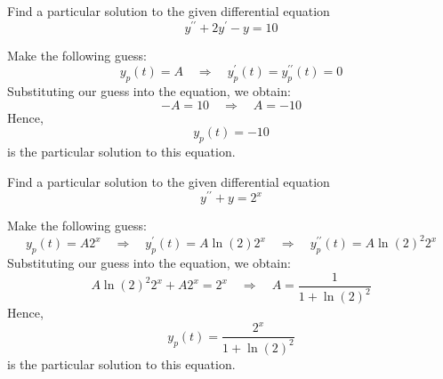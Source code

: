 \documentclass[11pt]{article}
\begin{document}
\begin{problem}
Find a particular solution to the given differential equation
\begin{equation*}
y^{\prime \prime} +2 y^{\prime} - y =10
\end{equation*}
\end{problem}
\begin{solution}
Make the following guess:
\begin{equation*}
y_{p}(t) = A \quad \Rightarrow \quad y_{p}^{\prime}(t) = y_{p}^{\prime \prime}(t) = 0
\end{equation*}
Substituting our guess into the equation, we obtain:
\begin{equation*}
-A =10 \quad \Rightarrow \quad A = -10
\end{equation*}
Hence, $$\boxed{y_{p}(t) = -10}$$ is the particular solution to this equation.
\end{solution}


\begin{problem}
Find a particular solution to the given differential equation
\begin{equation*}
y^{\prime \prime} +  y = 2^{x}
\end{equation*}
\end{problem}
\begin{solution}
Make the following guess:
\begin{equation*}
y_{p}(t) = A 2^{x} \quad \Rightarrow \quad y_{p}^{\prime}(t) =A \ln(2) 2^{x} \quad \Rightarrow \quad y_{p}^{\prime \prime}(t) = A \ln(2)^{2} 2^{x}
\end{equation*}
Substituting our guess into the equation, we obtain:
\begin{equation*}
A \ln(2)^{2} 2^{x} + A 2^{x} = 2^x \quad \Rightarrow \quad A = \dfrac{1}{1 + \ln(2)^2}
\end{equation*}
Hence, $$\boxed{y_{p}(t) = \dfrac{2^x}{1 + \ln(2)^2}}$$ is the particular solution to this equation.
\end{solution}
\end{document}
